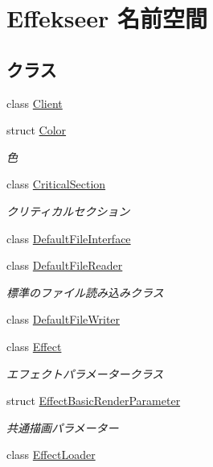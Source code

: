 \hypertarget{namespace_effekseer}{}\section{Effekseer 名前空間}
\label{namespace_effekseer}
\subsection*{クラス}
\begin{DoxyCompactItemize}
\item 
class \mbox{\hyperlink{class_effekseer_1_1_client}{Client}}
\item 
struct \mbox{\hyperlink{struct_effekseer_1_1_color}{Color}}
\begin{DoxyCompactList}\small\item\em 色 \end{DoxyCompactList}\item 
class \mbox{\hyperlink{class_effekseer_1_1_critical_section}{Critical\+Section}}
\begin{DoxyCompactList}\small\item\em クリティカルセクション \end{DoxyCompactList}\item 
class \mbox{\hyperlink{class_effekseer_1_1_default_file_interface}{Default\+File\+Interface}}
\item 
class \mbox{\hyperlink{class_effekseer_1_1_default_file_reader}{Default\+File\+Reader}}
\begin{DoxyCompactList}\small\item\em 標準のファイル読み込みクラス \end{DoxyCompactList}\item 
class \mbox{\hyperlink{class_effekseer_1_1_default_file_writer}{Default\+File\+Writer}}
\item 
class \mbox{\hyperlink{class_effekseer_1_1_effect}{Effect}}
\begin{DoxyCompactList}\small\item\em エフェクトパラメータークラス \end{DoxyCompactList}\item 
struct \mbox{\hyperlink{struct_effekseer_1_1_effect_basic_render_parameter}{Effect\+Basic\+Render\+Parameter}}
\begin{DoxyCompactList}\small\item\em 共通描画パラメーター \end{DoxyCompactList}\item 
class \mbox{\hyperlink{class_effekseer_1_1_effect_loader}{Effect\+Loader}}

\end{DoxyCompactItemize}
